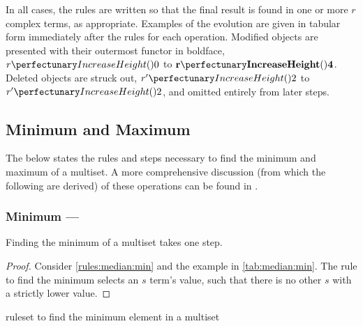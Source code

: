 In all cases, the rules are written so that the final result is found in one or more \(r\) complex terms, as appropriate.  Examples of the evolution are given in tabular form immediately after the rules for each operation.  Modified objects are presented with their outermost \gls{functor} in boldface, \eg{} \(\cpfunc{r}{0}\) to \(\mathbf{\cpfunc{r}{4}}\).  Deleted objects are struck out, \eg{} \(\cpfunc{r'}{2}\) to \sout{\(\cpfunc{r'}{2}\)}, and omitted entirely from later steps.


\subsection{\label{sec:median:minmax}Minimum and Maximum}

The below states the rules and steps necessary to find the minimum and maximum of a multiset.  A more comprehensive discussion (from which the following are derived) of these operations can be found in \cite{Cooper2019,Nicolescu2018}.

\subsubsection{Minimum --- }\label{sec:median:min}

\begin{proposition}\label{prop:median:min}
Finding the minimum of a multiset takes one step.
\end{proposition}

\begin{proof}
Consider \cref{rules:median:min} and the example in \cref{tab:median:min}.  The rule to find the minimum selects an \(s\) term's value, such that there is no other \(s\) with a strictly lower value.
\end{proof}

\begin{cprulesetfloat}
\begin{cpruleset}
\end{cpruleset}
\caption{\label{rules:median:min}\Gls{ruleset} to find the minimum element in a multiset}
\end{cprulesetfloat}


